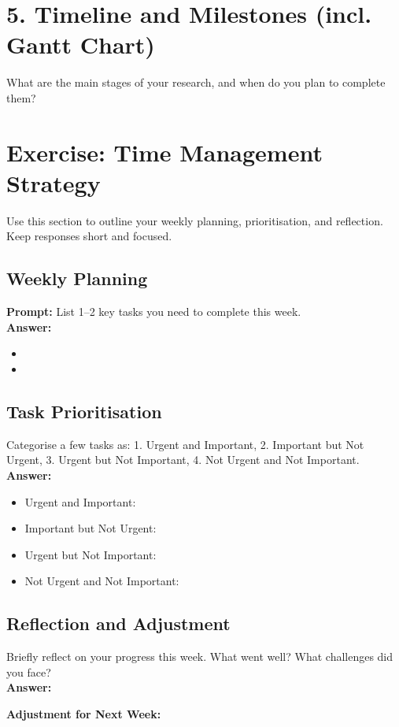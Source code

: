 \documentclass[a4paper,12pt]{article}
\begin{document}
\section{5. Timeline and Milestones (incl. Gantt Chart)}
What are the main stages of your research, and when do you plan to complete them?\\

\section{Exercise: Time Management Strategy}
Use this section to outline your weekly planning, prioritisation, and reflection. Keep responses short and focused.

\subsection*{Weekly Planning}
\textbf{Prompt:} List 1–2 key tasks you need to complete this week.\\
\textbf{Answer:}
\begin{itemize}
    \item 
    \item 
\end{itemize}

\subsection*{Task Prioritisation}
 Categorise a few tasks as: 1. Urgent and Important, 2. Important but Not Urgent, 3. Urgent but Not Important, 4. Not Urgent and Not Important.\\
\textbf{Answer:}
\begin{itemize}
    \item Urgent and Important: 
    \item Important but Not Urgent: 
    \item Urgent but Not Important: 
    \item Not Urgent and Not Important: 
\end{itemize}

\subsection*{Reflection and Adjustment}
Briefly reflect on your progress this week. What went well? What challenges did you face?\\
\textbf{Answer:} 

\noindent
\textbf{Adjustment for Next Week:} 
\end{document}

